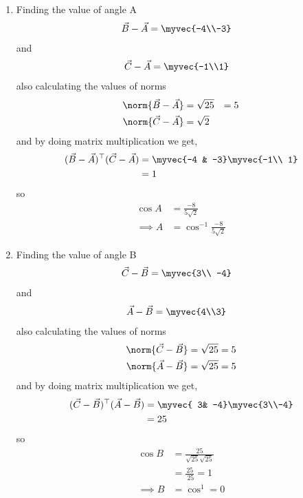 \documentclass[11pt]{book}
\begin{document}
\begin{enumerate}[label=\thesection.\arabic*.,ref=\thesection.\theenumi]
\begin{enumerate}
\item Finding the value of angle A
\begin{align}
	\vec{B}-\vec{A} &=\myvec{-4\\-3}
\end{align}
and 
\begin{align}
	\vec{C}-\vec{A}&= \myvec{-1\\1}
\end{align}
also calculating the values of norms
\begin{align}
	\norm{\vec{B}-\vec{A}} &= \sqrt{25} &= 5\\
	\norm{\vec{C}-\vec{A}} &= \sqrt{2}
\end{align}
and by doing matrix multiplication we get,
\begin{align}
\begin{split}
	(\vec{B}-\vec{A})^{\top}(\vec{C}-\vec{A})&=\myvec{-4 & -3}\myvec{-1\\ 1}\\
	&= 1
\end{split}
\end{align}
so 
\begin{align}
	\cos{A}&= \frac{-8}{5 \sqrt{2}}\\
	\implies A&=\cos^{-1}{\frac{-8}{5\sqrt{2}}}
\end{align}




\item Finding the value of angle B
\begin{align}
	\vec{C}-\vec{B} &=\myvec{3\\ -4}
\end{align}
and 
\begin{align}
	\vec{A}-\vec{B}&= \myvec{4\\3}
\end{align}
also calculating the values of norms
\begin{align}
	\norm{\vec{C}-\vec{B}} &= \sqrt{25} =5\\
	\norm{\vec{A}-\vec{B}} &= \sqrt{25} =5
\end{align}
and by doing matrix multiplication we get,
\begin{align}
\begin{split}
	(\vec{C}-\vec{B})^{\top}(\vec{A}-\vec{B})&=\myvec{ 3& -4}\myvec{3\\-4}\\
	&= 25
\end{split}
\end{align}
so 
\begin{align}
	\cos{B}&= \frac{25}{\sqrt{25} \sqrt{25}}\\
	&= \frac{25}{\ {25}} = 1\\
	\implies B&=\cos^{1} = 0
\end{align}




\end{enumerate}
\end{enumerate}
\end{document}

